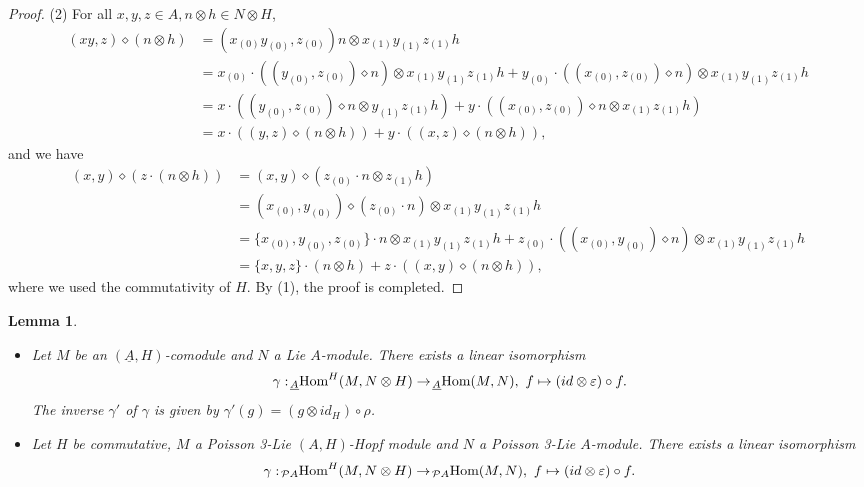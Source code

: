 \documentclass[11pt]{article}
\newtheorem{lemma}[theorem]{Lemma}
\def\di{\diamond}
\def\ot{\otimes}
\begin{document}
\begin{proof}
(2) For all  $x,y,z\in A,n\ot h\in N\ot H$,
\begin{align*}
(xy,z)\di (n\ot h)&=(x_{(0)}y_{(0)},z_{(0)})n\ot x_{(1)}y_{(1)}z_{(1)}h\\
&=x_{(0)}\cdot((y_{(0)},z_{(0)})\di n)\ot x_{(1)}y_{(1)}z_{(1)}h+y_{(0)}\cdot((x_{(0)},z_{(0)})\di n)\ot x_{(1)}y_{(1)}z_{(1)}h\\
&=x\cdot((y_{(0)},z_{(0)})\di n\ot y_{(1)}z_{(1)}h)+y\cdot((x_{(0)},z_{(0)})\di n\ot x_{(1)}z_{(1)}h)\\
&=x\cdot((y,z)\di(n\ot h))+y\cdot((x,z)\di(n\ot h)),
\end{align*}
and we have
\begin{align*}
(x,y)\di(z\cdot (n\ot h))&=(x,y)\di(z_{(0)}\cdot n\ot z_{(1)}h)\\
&=(x_{(0)},y_{(0)})\di (z_{(0)}\cdot n)\ot x_{(1)}y_{(1)}z _{(1)}h\\
&=\{x_{(0)},y_{(0)},z_{(0)}\}\cdot n\ot x_{(1)}y_{(1)}z _{(1)}h+z_{(0)}\cdot((x_{(0)},y_{(0)})\di n)\ot x_{(1)}y_{(1)}z _{(1)}h\\
&=\{x,y,z\}\cdot(n\ot h)+z\cdot((x,y)\di(n\ot h)),
\end{align*}
where we used the commutativity of $H$. By (1), the proof is completed.
\end{proof}

\begin{lemma}\label{lem:2d}
\begin{itemize}
  \item [(1)] Let $M$ be an $(\underline{A},H)$-comodule and $N$ a Lie $A$-module. There exists a linear isomorphism
$$\gamma:\! _{\underline{A}}\textup{Hom}^H(M,N\ot H)\rightarrow \! _{\underline{A}}\textup{Hom}(M,N),\ f\mapsto(id\ot\varepsilon)\circ f.$$
The inverse $\gamma'$ of $\gamma$ is given by $\gamma'(g)=(g\ot id_H)\circ\rho$.
  \item [(2)] Let $H$ be commutative, $M$ a Poisson 3-Lie $(A, H)$-Hopf module and $N$ a Poisson 3-Lie $A$-module. There exists a linear isomorphism
$$\gamma:\! _{\mathcal{P}A}\textup{Hom}^H(M,N\ot H)\rightarrow\! _{\mathcal{P}A}\textup{Hom}(M,N),\ f\mapsto(id\ot\varepsilon)\circ f.$$
\end{itemize}
\end{lemma}
\end{document}
